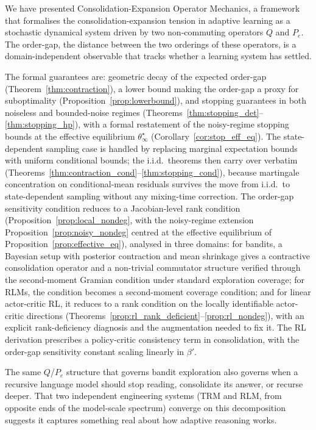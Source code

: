 \documentclass[12pt,a4paper]{article}
\begin{document}
We have presented Consolidation-Expansion Operator Mechanics, a framework that
formalises the consolidation-expansion tension in adaptive learning as a
stochastic dynamical system driven by two non-commuting operators $Q$ and
$P_e$. The order-gap, the distance between the two orderings of these
operators, is a domain-independent observable that tracks whether a learning
system has settled.

The formal guarantees are: geometric decay of the expected
order-gap (Theorem~\ref{thm:contraction}), a lower bound making
the order-gap a proxy for suboptimality (Proposition~\ref{prop:lowerbound}),
and stopping guarantees in both noiseless and bounded-noise regimes
(Theorems~\ref{thm:stopping_det}--\ref{thm:stopping_hp}), with a formal
restatement of the noisy-regime stopping bounds at the effective equilibrium
$\theta^\star_\infty$ (Corollary~\ref{cor:stop_eff_eq}). The
state-dependent sampling case is handled by replacing marginal expectation
bounds with uniform conditional bounds; the i.i.d.\ theorems then carry over
verbatim (Theorems~\ref{thm:contraction_cond}--\ref{thm:stopping_cond}),
because martingale concentration on conditional-mean residuals survives the
move from i.i.d.\ to state-dependent sampling without any mixing-time
correction. The order-gap sensitivity condition reduces to a Jacobian-level
rank condition (Proposition~\ref{prop:local_nondeg}, with the noisy-regime
extension Proposition~\ref{prop:noisy_nondeg} centred at the effective
equilibrium of Proposition~\ref{prop:effective_eq}), analysed in three
domains: for bandits, a Bayesian setup with posterior contraction and mean
shrinkage gives a contractive consolidation operator and a non-trivial
commutator structure verified through the second-moment Gramian condition
under standard exploration coverage; for RLMs, the condition becomes a
second-moment coverage condition; and for linear actor-critic RL, it reduces
to a rank condition on the locally identifiable actor-critic directions
(Theorems~\ref{prop:rl_rank_deficient}--\ref{prop:rl_nondeg}), with an
explicit rank-deficiency diagnosis and the augmentation needed to fix it.
The RL derivation prescribes a policy-critic consistency term in consolidation,
with the order-gap sensitivity constant scaling linearly in $\beta'$.

The same $Q$/$P_e$ structure that governs bandit exploration also governs when
a recursive language model should stop reading, consolidate its answer, or
recurse deeper. That two independent engineering systems (TRM and RLM, from
opposite ends of the model-scale spectrum) converge on this decomposition
suggests it captures something real about how adaptive reasoning works.
\end{document}
